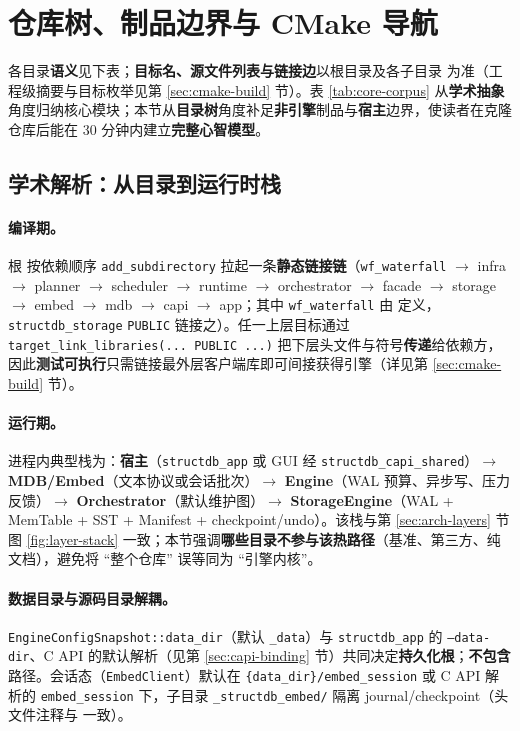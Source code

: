 \section{仓库树、制品边界与 CMake 导航}
\label{sec:repo-tree}

各目录\textbf{语义}见下表；\textbf{目标名、源文件列表与链接边}以根目录及各子目录  为准（工程级摘要与目标枚举见第 \ref{sec:cmake-build} 节）。表 \ref{tab:core-corpus} 从\textbf{学术抽象}角度归纳核心模块；本节从\textbf{目录树}角度补足\textbf{非引擎}制品与\textbf{宿主}边界，使读者在克隆仓库后能在 30 分钟内建立\textbf{完整心智模型}。

\subsection{学术解析：从目录到运行时栈}

\paragraph{编译期。}根  按依赖顺序 \texttt{add\_subdirectory} 拉起一条\textbf{静态链接链}（\texttt{wf\_waterfall} $\rightarrow$ infra $\rightarrow$ planner $\rightarrow$ scheduler $\rightarrow$ runtime $\rightarrow$ orchestrator $\rightarrow$ facade $\rightarrow$ storage $\rightarrow$ embed $\rightarrow$ mdb $\rightarrow$ capi $\rightarrow$ app；其中 \texttt{wf\_waterfall} 由  定义，\texttt{structdb\_storage} \texttt{PUBLIC} 链接之）。任一上层目标通过 \texttt{target\_link\_libraries(... PUBLIC ...)} 把下层头文件与符号\textbf{传递}给依赖方，因此\textbf{测试可执行}只需链接最外层客户端库即可间接获得引擎（详见第 \ref{sec:cmake-build} 节）。

\paragraph{运行期。}进程内典型栈为：\textbf{宿主}（\texttt{structdb\_app} 或 GUI 经 \texttt{structdb\_capi\_shared}）$\rightarrow$ \textbf{MDB/Embed}（文本协议或会话批次）$\rightarrow$ \textbf{Engine}（WAL 预算、异步写、压力反馈）$\rightarrow$ \textbf{Orchestrator}（默认维护图）$\rightarrow$ \textbf{StorageEngine}（WAL + MemTable + SST + Manifest + checkpoint/undo）。该栈与第 \ref{sec:arch-layers} 节图 \ref{fig:layer-stack} 一致；本节强调\textbf{哪些目录不参与该热路径}（基准、第三方、纯文档），避免将 ``整个仓库'' 误等同为 ``引擎内核''。

\paragraph{数据目录与源码目录解耦。}\texttt{EngineConfigSnapshot::data\_dir}（默认 \texttt{\_data}）与 \texttt{structdb\_app} 的 \texttt{--data-dir}、C API 的默认解析（见第 \ref{sec:capi-binding} 节）共同决定\textbf{持久化根}；\textbf{不包含}  路径。会话态（\texttt{EmbedClient}）默认在 \texttt{\{data\_dir\}/embed\_session} 或 C API 解析的 \texttt{embed\_session} 下，子目录 \texttt{\_structdb\_embed/} 隔离 journal/checkpoint（头文件注释与  一致）。


